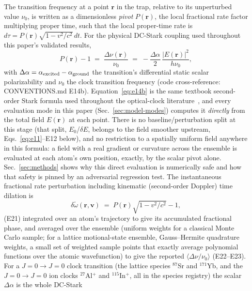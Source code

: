 \documentclass[aps,pra,superscriptaddress,groupedaddress,nofootinbib]{revtex4-2}
\begin{document}
The transition frequency at a point $\mathbf{r}$ in the trap, relative to
its unperturbed value $\nu_0$, is written as a dimensionless
\emph{pivot} $P(\mathbf{r})$, the local fractional rate factor
multiplying proper time, such that the local proper-time rate is
$d\tau = P(\mathbf{r})\sqrt{1-v^2/c^2}\,dt$. For the physical DC-Stark
coupling used throughout this paper's validated results,
\begin{equation}
  P(\mathbf{r}) - 1 \;=\; \frac{\Delta\nu(\mathbf{r})}{\nu_0}
  \;=\; -\frac{\Delta\alpha}{2}\,\frac{|E(\mathbf{r})|^2}{h\nu_0} ,
  \label{eq:e14b}
\end{equation}
with $\Delta\alpha = \alpha_{\rm excited}-\alpha_{\rm ground}$ the
transition's differential static scalar polarizability and $\nu_0$ the
clock transition frequency (code cross-reference: CONVENTIONS.md
E14b). Equation~\eqref{eq:e14b} is the same textbook second-order
Stark formula used throughout the optical-clock
literature~\cite{Middelmann2012,Sherman2012,Bowden2017}, and every
evaluation mode in this paper (Sec.~\ref{sec:model-modes}) computes it
\emph{directly} from the total field $E(\mathbf{r})$ at each point.
There is no baseline/perturbation split at this stage (that split,
$E_0$/$\delta E$, belongs to the field smoother upstream,
Eqs.~\eqref{eq:e11}--E12 below), and no restriction to a spatially
uniform field anywhere in this formula: a field with a real gradient or
curvature across the ensemble is evaluated at each atom's own position,
exactly, by the scalar pivot alone. Sec.~\ref{sec:methods} shows why
this direct evaluation is numerically safe and how that safety is
pinned by an adversarial regression test. The
instantaneous fractional rate perturbation including kinematic
(second-order Doppler) time dilation is
\begin{equation}
  \delta\tilde\omega(\mathbf{r},\mathbf{v}) \;=\;
  P(\mathbf{r})\sqrt{1-v^2/c^2} - 1 ,
  \label{eq:e21}
\end{equation}
(E21) integrated over an atom's trajectory to give its accumulated
fractional phase, and averaged over the ensemble (uniform weights for a
classical Monte Carlo sample; for a lattice motional-state ensemble,
Gauss--Hermite quadrature weights, a small set of weighted sample points
that exactly average polynomial functions over the atomic wavefunction)
to give the reported $\langle\Delta\nu/\nu_0\rangle$ (E22--E23).
For a $J{=}0\!\to\!J{=}0$
clock transition (the lattice species $^{87}$Sr and $^{171}$Yb, and the
$J{=}0\!\to\!J{=}0$ ion clocks $^{27}$Al$^+$ and $^{115}$In$^+$, all in
the species registry) the scalar $\Delta\alpha$ is the whole DC-Stark
\end{document}
